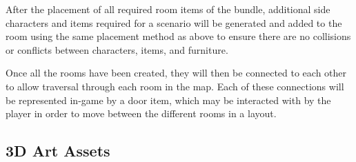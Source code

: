 After the placement of all required room items of the bundle, additional side characters and items required for a scenario will be generated and added to the room using the same placement method as above to ensure there are no collisions or conflicts between characters, items, and furniture.

Once all the rooms have been created, they will then be connected to each other to allow traversal through each room in the map. Each of these connections will be represented in-game by a door item, which may be interacted with by the player in order to move between the different rooms in a layout.

\clearpage
\subsection{3D Art Assets}

